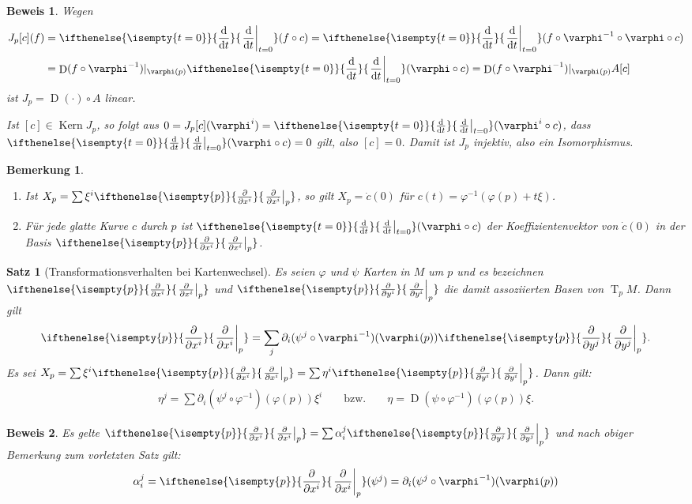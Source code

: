 \documentclass[paper=A4, twoside, chapterprefix=true, bibliography=totoc, headsepline]{scrbook}
\let\temp\phi{}
\let\phi\varphi{}
\let\varphi\temp{}
\let\temp\theta{}
\let\theta\vartheta{}
\let\vartheta\temp{}
\let\temp\epsilon{}
\let\epsilon\varepsilon{}
\let\varepsilon\temp{}
\let\temp\rho{}
\let\rho\varrho{}
\let\varrho\temp{}
\DeclareMathOperator{\D}{D}         %
\DeclareMathOperator{\Kern}{Kern}
\DeclareMathOperator{\T}{T}         %
\newcommand{\dop}{\mathrm{d}}
\newcommand{\difffrac}[3][]{\ifthenelse{\isempty{#1}}{\frac{\dop #2}{\dop #3}}{\left. \frac{\dop #2}{\dop #3} \right|_{#1}}}
\newcommand{\pdifffrac}[3][]{\ifthenelse{\isempty{#1}}{\frac{\partial #2}{\partial #3}}{\left. \frac{\partial #2}{\partial #3} \right|_{#1}}}
\theoremstyle{plain}
\newtheorem{Satz}[Dfn]{Satz}
\theoremstyle{nonumberplain}
\newtheorem{bem}{Bemerkung}
\newtheorem{bew}{Beweis}
\theoremstyle{empty}
\theoremstyle{break}
\begin{document}
\begin{bew}
  Wegen
  \begin{align*}
    J_p[c](f)& = \difffrac[t=0]{}{t}(f\circ c) = \difffrac[t=0]{}{t}(f \circ \phi^{-1} \circ \phi \circ c)\\
    &  = \D(f \circ \phi^{-1})|_{\phi(p)} \difffrac[t=0]{}{t} (\phi \circ c) = \D (f\circ \phi^{-1})|_{\phi(p)}A[c]
  \end{align*}
  ist $J_p = \D(\cdot)\circ A$ linear.

  Ist $[c] \in \Kern J_p$, so folgt aus $0 = J_p[c](\phi^i) = \difffrac[t=0]{}{t}(\phi^i \circ c)$, dass $\difffrac[t=0]{}{t}(\phi \circ c) = 0$ gilt, also $[c] = 0$. Damit ist $J_p$ injektiv, also ein Isomorphismus.
\end{bew}

\begin{bem}
  \begin{enumerate}[label=\arabic*)]
  \item Ist $X_p = \sum \xi^i\pdifffrac[p]{}{x^i}$, so gilt $X_p = \dot c(0)$ f\"ur $c(t) = \phi^{-1}(\phi(p) + t\xi)$.
\item F\"ur jede glatte Kurve $c$ durch $p$ ist $\difffrac[t=0]{}{t}(\phi \circ c)$ der Koeffizientenvektor von $\dot c(0)$ in der Basis $\pdifffrac[p]{}{x^i}$.
  \end{enumerate}
\end{bem}


\begin{Satz}[Transformationsverhalten bei Kartenwechsel]\label{satz-2-10}
  Es seien $\phi$ und $\psi$ Karten in $M$ um $p$ und es bezeichnen $\pdifffrac[p]{}{x^i}$ und $\pdifffrac[p]{}{y^i}$ die damit assoziierten Basen von $\T_pM$. Dann gilt
  \begin{align*}
    \pdifffrac[p]{}{x^i} = \sum_j \partial_i(\psi^j \circ \phi^{-1})(\phi(p)) \pdifffrac[p]{}{y^j}.
  \end{align*}
Es sei $X_p = \sum \xi^i \pdifffrac[p]{}{x^i} = \sum \eta^i\pdifffrac[p]{}{y^i}$. Dann gilt:
\begin{align*}
  \eta^j = \sum \partial_i(\psi^j \circ \phi^{-1})(\phi(p))\xi^i && \text{ bzw. } &&
  \eta = \D(\psi \circ \phi^{-1})(\phi(p))\xi.
\end{align*}
\end{Satz}

\begin{bew}
  Es gelte $\pdifffrac[p]{}{x^i} = \sum \alpha_i^j\pdifffrac[p]{}{y^j}$ und nach obiger Bemerkung zum vorletzten Satz gilt:
  \begin{align*}
    \alpha_i^j = \pdifffrac[p]{}{x^i}(\psi^j) = \partial_i(\psi^j \circ \phi^{-1})(\phi(p))
  \end{align*}
\end{bew}
\end{document}
